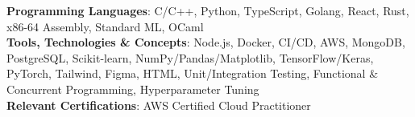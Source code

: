 
\begin{itemize}[leftmargin=0in, label={}]
  \scriptsize{
    \item{
      \textbf{Programming Languages}{: C/C++, Python, TypeScript, Golang, React, Rust, x86-64 Assembly, Standard ML, OCaml} \\
      \textbf{Tools, Technologies \& Concepts}{: Node.js, Docker, CI/CD, AWS, MongoDB, PostgreSQL, Scikit-learn, NumPy/Pandas/Matplotlib, TensorFlow/Keras, PyTorch, Tailwind, Figma, HTML, Unit/Integration Testing, Functional \& Concurrent Programming, Hyperparameter Tuning} \\
      \textbf{Relevant Certifications}{: AWS Certified Cloud Practitioner}
      }
  }
\end{itemize}